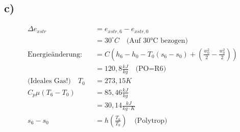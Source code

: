 

\subsection*{c)}
\begin{align*}
\Delta e_{xstr} &= e_{xstr,6} - e_{xstr,0} \\
&= 30^\circ C \quad \text{(Auf 30°C bezogen)} \\
\text{Energieänderung:} \quad &= C(h_6 - h_0 - T_0 (s_6 - s_0) + \left( \frac{w_0^2}{2} - \frac{w_0^2}{2} \right)) \\
&= 120,8 \frac{kJ}{kg} \quad \text{(PO=R6)} \\
\text{(Ideales Gas!)} \quad T_0 &= 273,15 K \\
C_p \mu (T_6 - T_0) &= 85,46 \frac{kJ}{kg} \\
&= 30,14 \frac{kJ}{kg \cdot K} \\
s_6 - s_0 &= h \left( \frac{T_0}{T_0} \right) \quad \text{(Polytrop)} \\
\end{align*}
